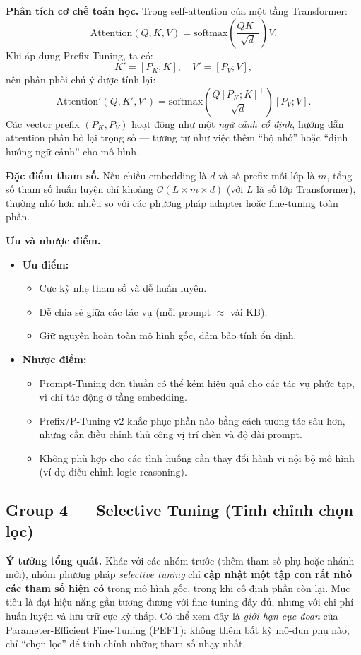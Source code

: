 \textbf{Phân tích cơ chế toán học.}  
Trong self-attention của một tầng Transformer:
\[
\text{Attention}(Q, K, V) = \text{softmax}\left( \frac{QK^\top}{\sqrt{d}} \right)V.
\]
Khi áp dụng Prefix-Tuning, ta có:
\[
K' = [P_K; K], \quad V' = [P_V; V],
\]
nên phân phối chú ý được tính lại:
\[
\text{Attention}'(Q, K', V') = \text{softmax}\left( \frac{Q [P_K; K]^\top}{\sqrt{d}} \right)[P_V; V].
\]
Các vector prefix $(P_K, P_V)$ hoạt động như một \textit{ngữ cảnh cố định}, hướng dẫn attention phân bố lại trọng số — tương tự như việc thêm “bộ nhớ” hoặc “định hướng ngữ cảnh” cho mô hình.

\textbf{Đặc điểm tham số.}  
Nếu chiều embedding là $d$ và số prefix mỗi lớp là $m$, tổng số tham số huấn luyện chỉ khoảng $\mathcal{O}(L \times m \times d)$ (với $L$ là số lớp Transformer), thường nhỏ hơn nhiều so với các phương pháp adapter hoặc fine-tuning toàn phần.

\textbf{Ưu và nhược điểm.}
\begin{itemize}
	\item \textbf{Ưu điểm:}
	\begin{itemize}
		\item Cực kỳ nhẹ tham số và dễ huấn luyện.  
		\item Dễ chia sẻ giữa các tác vụ (mỗi prompt $\approx$ vài KB).  
		\item Giữ nguyên hoàn toàn mô hình gốc, đảm bảo tính ổn định.  
	\end{itemize}
	\item \textbf{Nhược điểm:}
	\begin{itemize}
		\item Prompt-Tuning đơn thuần có thể kém hiệu quả cho các tác vụ phức tạp, vì chỉ tác động ở tầng embedding.  
		\item Prefix/P-Tuning v2 khắc phục phần nào bằng cách tương tác sâu hơn, nhưng cần điều chỉnh thủ công vị trí chèn và độ dài prompt.  
		\item Không phù hợp cho các tình huống cần thay đổi hành vi nội bộ mô hình (ví dụ điều chỉnh logic reasoning).  
	\end{itemize}
\end{itemize}

\subsection{Group 4 — Selective Tuning (Tinh chỉnh chọn lọc)}
\label{ssec:selective}

\textbf{Ý tưởng tổng quát.}  
Khác với các nhóm trước (thêm tham số phụ hoặc nhánh mới), nhóm phương pháp \textit{selective tuning} chỉ \textbf{cập nhật một tập con rất nhỏ các tham số hiện có} trong mô hình gốc, trong khi cố định phần còn lại.  
Mục tiêu là đạt hiệu năng gần tương đương với fine-tuning đầy đủ, nhưng với chi phí huấn luyện và lưu trữ cực kỳ thấp.  
Có thể xem đây là \emph{giới hạn cực đoan} của Parameter-Efficient Fine-Tuning (PEFT): không thêm bất kỳ mô-đun phụ nào, chỉ “chọn lọc” để tinh chỉnh những tham số nhạy nhất.

